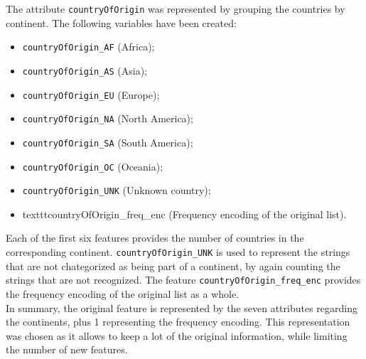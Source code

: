 The attribute \texttt{countryOfOrigin} was represented by grouping the countries by continent.
The following variables have been created: 
\begin{multicols}{2}
    \begin{itemize}
        \item \texttt{countryOfOrigin\_AF} (Africa);
        \item \texttt{countryOfOrigin\_AS} (Asia);
        \item \texttt{countryOfOrigin\_EU} (Europe);
        \item \texttt{countryOfOrigin\_NA} (North America);
        \item \texttt{countryOfOrigin\_SA} (South America);
        \item \texttt{countryOfOrigin\_OC} (Oceania);
        \item \texttt{countryOfOrigin\_UNK} (Unknown country);
        \item texttt{countryOfOrigin\_freq\_enc} (Frequency encoding of the original list).
    \end{itemize}
\end{multicols}

Each of the first six features provides the number of countries in the corresponding continent.
\texttt{countryOfOrigin\_UNK} is used to represent the strings that are not chategorized as being part of a
continent, by again counting the strings that are not recognized.
The feature \texttt{countryOfOrigin\_freq\_enc} provides the frequency encoding of the
original list as a whole.\\

In summary, the original feature is represented by the seven attributes regarding
the continents, plus 1 representing the frequency encoding. This representation was chosen as it allows to
keep a lot of the original information, while limiting the number of new features.\\





